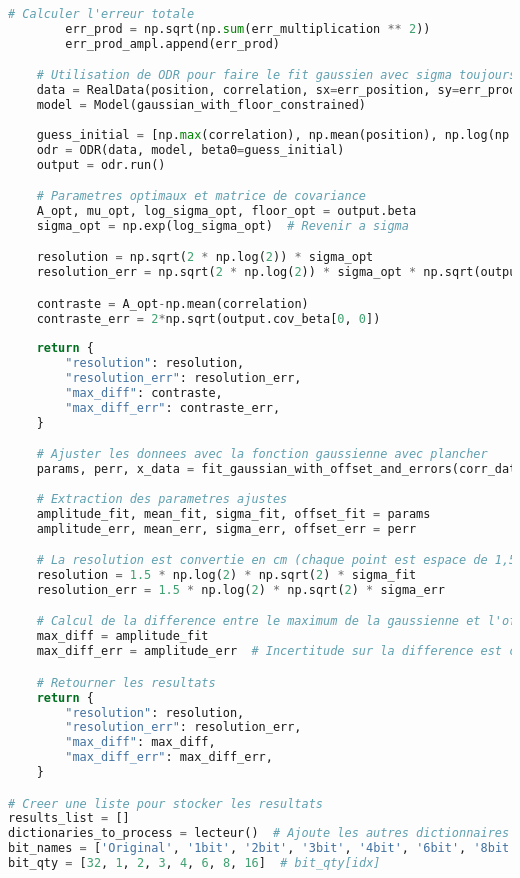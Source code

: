 \documentclass[11pt,letterpaper]{article}
\begin{document}
\begin{lstlisting}[language=python]
        # Calculer l'erreur totale
        err_prod = np.sqrt(np.sum(err_multiplication ** 2))
        err_prod_ampl.append(err_prod)

    # Utilisation de ODR pour faire le fit gaussien avec sigma toujours positif
    data = RealData(position, correlation, sx=err_position, sy=err_prod_ampl)
    model = Model(gaussian_with_floor_constrained)
    
    guess_initial = [np.max(correlation), np.mean(position), np.log(np.std(position)), np.mean(correlation)]
    odr = ODR(data, model, beta0=guess_initial)
    output = odr.run()

    # Parametres optimaux et matrice de covariance
    A_opt, mu_opt, log_sigma_opt, floor_opt = output.beta
    sigma_opt = np.exp(log_sigma_opt)  # Revenir a sigma

    resolution = np.sqrt(2 * np.log(2)) * sigma_opt
    resolution_err = np.sqrt(2 * np.log(2)) * sigma_opt * np.sqrt(output.cov_beta[2, 2])

    contraste = A_opt-np.mean(correlation)
    contraste_err = 2*np.sqrt(output.cov_beta[0, 0])
    
    return {
        "resolution": resolution,
        "resolution_err": resolution_err,
        "max_diff": contraste,
        "max_diff_err": contraste_err,
    }

    # Ajuster les donnees avec la fonction gaussienne avec plancher
    params, perr, x_data = fit_gaussian_with_offset_and_errors(corr_data, yerr)
    
    # Extraction des parametres ajustes
    amplitude_fit, mean_fit, sigma_fit, offset_fit = params
    amplitude_err, mean_err, sigma_err, offset_err = perr

    # La resolution est convertie en cm (chaque point est espace de 1,5cm)
    resolution = 1.5 * np.log(2) * np.sqrt(2) * sigma_fit
    resolution_err = 1.5 * np.log(2) * np.sqrt(2) * sigma_err  

    # Calcul de la difference entre le maximum de la gaussienne et l'offset
    max_diff = amplitude_fit
    max_diff_err = amplitude_err  # Incertitude sur la difference est celle de l'amplitude

    # Retourner les resultats
    return {
        "resolution": resolution,
        "resolution_err": resolution_err,
        "max_diff": max_diff,
        "max_diff_err": max_diff_err,
    }

# Creer une liste pour stocker les resultats
results_list = []
dictionaries_to_process = lecteur()  # Ajoute les autres dictionnaires ici
bit_names = ['Original', '1bit', '2bit', '3bit', '4bit', '6bit', '8bit', '16bit']
bit_qty = [32, 1, 2, 3, 4, 6, 8, 16]  # bit_qty[idx]


\end{lstlisting}
\end{document}

